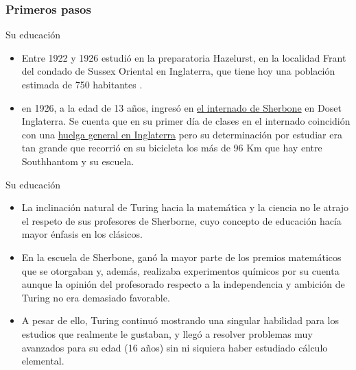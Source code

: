 \documentclass{beamer}
\begin{document}
\subsubsection{Primeros pasos}
\begin{frame}{Su educación}
    \begin{itemize}
        \item Entre 1922 y 1926 estudió en la preparatoria Hazelurst, en la localidad Frant del condado de Sussex Oriental en Inglaterra, que tiene hoy una población estimada de 750 habitantes .\pause
        \item en 1926, a la edad de 13 años, ingresó en  \href{https://hmong.es/wiki/Sherborne_School}{el internado de Sherbone} en Doset Inglaterra. Se cuenta que en su primer día de clases en el internado coincidión con una \href{https://artsandculture.google.com/entity/m0hys9?hl=es}{huelga general en Inglaterra} pero su determinación por estudiar era tan grande que recorrió en su bicicleta los más de 96 Km que hay entre Southhantom y su escuela.
    \end{itemize}
\end{frame}
\begin{frame}{Su educación}
    \begin{itemize}
        \item La inclinación natural de Turing hacia la matemática y la ciencia no le atrajo el respeto de sus profesores de Sherborne, cuyo concepto de educación hacía mayor énfasis en los clásicos.\pause
        \item  En la escuela de Sherbone, ganó la mayor parte de los premios matemáticos que se otorgaban y, además, realizaba experimentos químicos por su cuenta aunque la opinión del profesorado respecto a la independencia y ambición de Turing no era demasiado favorable.\pause
        \item A pesar de ello, Turing continuó mostrando una singular habilidad para los estudios que realmente le gustaban, y llegó a resolver problemas muy avanzados para su edad (16 años) sin ni siquiera haber estudiado cálculo elemental.
    \end{itemize}
\end{frame}
\end{document}
